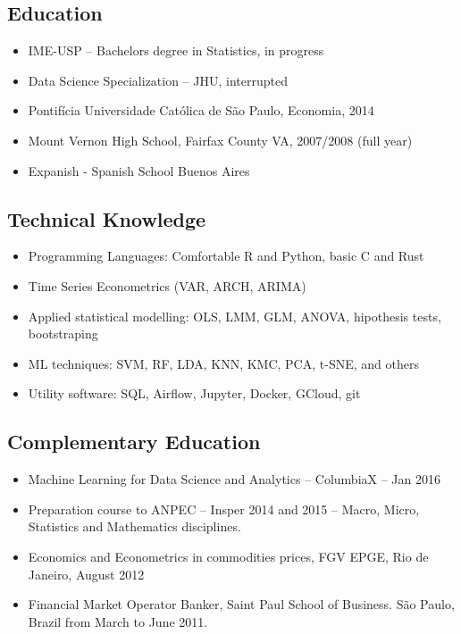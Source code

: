 \documentclass{article}
\begin{document}
\setlength\multicolsep{0pt}

\begin{multicols}{2}
\normalsize

\subsection{Education}
\begin{itemize}
\item{IME-USP – Bachelors degree in Statistics, in progress} 
\item{Data Science Specialization – JHU, interrupted} 
\item{Pontifícia Universidade Católica de São Paulo, Economia, 2014}
\item{Mount Vernon High School, Fairfax County VA, 2007/2008 (full year)}
\item{Expanish - Spanish School Buenos Aires}
\end{itemize}


\subsection{Technical Knowledge}
\begin{itemize}
\item{Programming Languages: Comfortable R and Python, basic C and Rust} 
\item{Time Series Econometrics (VAR, ARCH, ARIMA)} 
\item{Applied statistical modelling: OLS, LMM, GLM, ANOVA, hipothesis tests, bootstraping}
\item{ML techniques: SVM, RF, LDA, KNN, KMC, PCA, t-SNE, and others}
\item{Utility software: SQL, Airflow, Jupyter, Docker, GCloud, git}
\end{itemize}

\subsection{Complementary Education}
\begin{itemize}
\item{Machine Learning for Data Science and Analytics – ColumbiaX – Jan 2016} 
\item{Preparation course to ANPEC – Insper 2014 and 2015 – Macro, Micro, Statistics and Mathematics disciplines.} 
\item{Economics and Econometrics in commodities prices, FGV EPGE, Rio de Janeiro, August 2012} 
\item{Financial Market Operator Banker, Saint Paul School of Business. São Paulo, Brazil from March to June 2011.}
\end{itemize}


\end{multicols}
\end{document}
